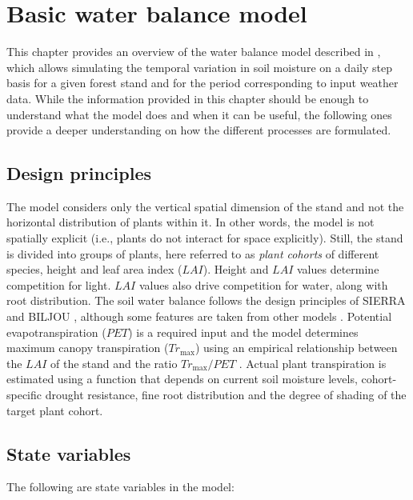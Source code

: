 \documentclass[]{book}
\begin{document}
\chapter{Basic water balance model}\label{basicwaterbalance}

This chapter provides an overview of the water balance model described
in \citet{DeCaceres2015}, which allows simulating the temporal variation
in soil moisture on a daily step basis for a given forest stand and for
the period corresponding to input weather data. While the information
provided in this chapter should be enough to understand what the model
does and when it can be useful, the following ones provide a deeper
understanding on how the different processes are formulated.

\section{Design principles}\label{design-principles}

The model considers only the vertical spatial dimension of the stand and
not the horizontal distribution of plants within it. In other words, the
model is not spatially explicit (i.e., plants do not interact for space
explicitly). Still, the stand is divided into groups of plants, here
referred to as \emph{plant cohorts} of different species, height and
leaf area index (\(LAI\)). Height and \(LAI\) values determine
competition for light. \(LAI\) values also drive competition for water,
along with root distribution. The soil water balance follows the design
principles of SIERRA \citep{Mouillot2001, Ruffault2014, Ruffault2013}
and BILJOU \citetext{\citealp{Granier1999}; \citeyear{Granier2007}},
although some features are taken from other models \citep{Kergoat1998}.
Potential evapotranspiration (\(PET\)) is a required input and the model
determines maximum canopy transpiration (\(Tr_{\max}\)) using an
empirical relationship between the \(LAI\) of the stand and the ratio
\(Tr_{\max}/PET\) \citep{Granier1999}. Actual plant transpiration is
estimated using a function that depends on current soil moisture levels,
cohort-specific drought resistance, fine root distribution and the
degree of shading of the target plant cohort.

\section{State variables}\label{state-variables}

The following are state variables in the model:
\end{document}

